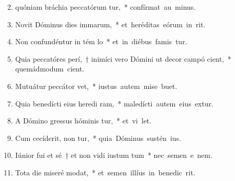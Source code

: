 \begin{flushleft}
\begin{enumerate}[leftmargin=*]
\setcounter{enumi}{1}

\item quóniam bráchia peccatórum tur,~* \mbox{confírmat au  minus.}

\item Novit Dóminus dies immarum,~* \mbox{et heréditas eórum in  rit.}

\item Non confundéntur in tém lo~* \mbox{et in diébus famis tur.}

\item Quia peccatóres perí,~† inimíci vero Dómini ut decor campó cient,~* \mbox{quemádmodum  cient.}

\item Mutuátur peccátor   vet,~* \mbox{iustus autem mise  buet.}

\item Quia benedícti eius heredi ram,~* \mbox{maledícti autem eius extur.}

\item A Dómino gressus hóminis tur,~* \mbox{et vi  let.}

\item Cum cecíderit, non tur,~* \mbox{quia Dóminus sustén  ius.}

\item Iúnior fui et sé~† et non vidi iustum tum~* \mbox{nec semen e  nem.}

\item Tota die miseré  modat,~* \mbox{et semen illíus in benedic rit.}


\end{enumerate}
\end{flushleft}
